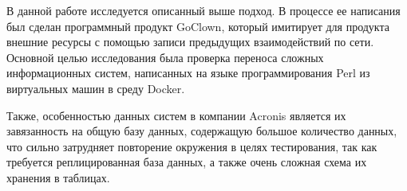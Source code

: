 В данной работе исследуется описанный выше подход. В процессе ее написания
был сделан программный продукт GoClown, который имитирует для продукта внешние
ресурсы с помощью записи предыдущих взаимодействий по сети. Основной целью
исследования была проверка переноса сложных информационных систем, написанных
на языке программирования Perl из виртуальных машин в среду Docker.

Также, особенностью данных систем в компании Acronis является их завязанность
на общую базу данных, содержащую большое количество данных, что сильно
затрудняет повторение окружения в целях тестирования, так как требуется
реплицированная база данных, а также очень сложная схема их хранения в таблицах.

